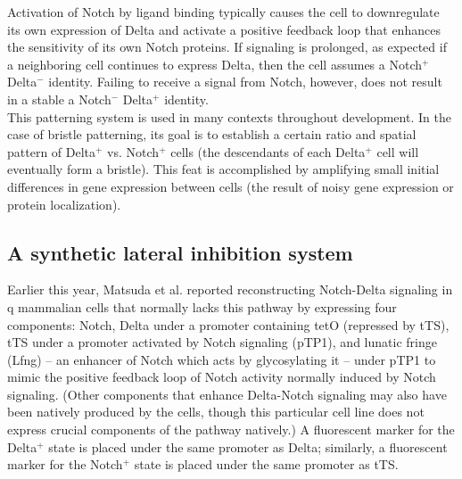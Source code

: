 \documentclass{article}
\begin{document}
Activation of Notch by ligand binding typically causes the cell to downregulate its own expression of Delta and activate a positive feedback loop that enhances the sensitivity of its own Notch proteins. If signaling is prolonged, as expected if a neighboring cell continues to express Delta, then the cell assumes a Notch$^+$ Delta$^-$ identity. Failing to receive a signal from Notch, however, does not result in a stable a Notch$^-$ Delta$^+$ identity.\\

This patterning system is used in many contexts throughout development. In the case of bristle patterning, its goal is to establish a certain ratio and spatial pattern of Delta$^+$ vs. Notch$^+$ cells (the descendants of each Delta$^+$ cell will eventually form a bristle). This feat is accomplished by amplifying small initial differences in gene expression between cells (the result of noisy gene expression or protein localization).

\subsection*{A synthetic lateral inhibition system}

Earlier this year, Matsuda et al. reported reconstructing Notch-Delta signaling in q mammalian cells that normally lacks this pathway by expressing four components: Notch, Delta under a promoter containing tetO (repressed by tTS), tTS under a promoter activated by Notch signaling (pTP1), and lunatic fringe (Lfng) -- an enhancer of Notch which acts by glycosylating it -- under pTP1 to mimic the positive feedback loop of Notch activity normally induced by Notch signaling. (Other components that enhance Delta-Notch signaling may also have been natively produced by the cells, though this particular cell line does not express crucial components of the pathway natively.) A fluorescent marker for the Delta$^+$ state is placed under the same promoter as Delta; similarly, a fluorescent marker for the Notch$^+$ state is placed under the same promoter as tTS.\\
\end{document}
